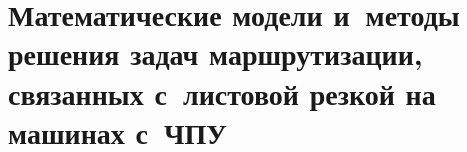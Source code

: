 

\part{
  Математические модели и~методы решения задач маршрутизации,
  связанных с~листовой резкой на машинах с~ЧПУ
}






